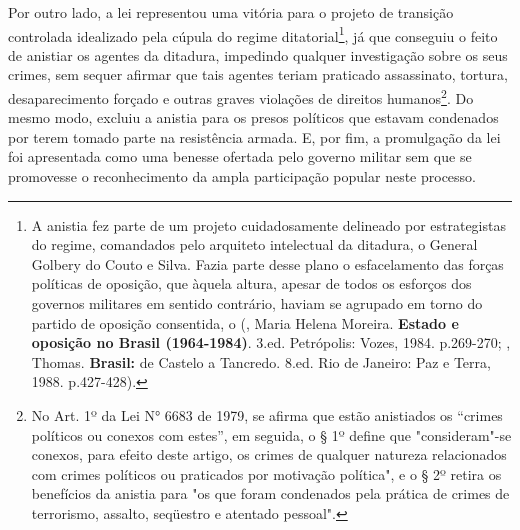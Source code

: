 Por outro lado, a lei representou uma vitória para o projeto de
transição controlada idealizado pela cúpula do regime
ditatorial\footnote{A anistia fez parte de um projeto cuidadosamente
  delineado por estrategistas do regime, comandados pelo arquiteto
  intelectual da ditadura, o General Golbery do Couto e Silva. Fazia
  parte desse plano o esfacelamento das forças políticas de oposição,
  que àquela altura, apesar de todos os esforços dos governos militares
  em sentido contrário, haviam se agrupado em torno do partido de
  oposição consentida, o  (, Maria Helena Moreira.
  \textbf{Estado e oposição no Brasil (1964-1984)}. 3.ed. Petrópolis:
  Vozes, 1984. p.269-270; , Thomas. \textbf{Brasil:} de Castelo
  a Tancredo. 8.ed. Rio de Janeiro: Paz e Terra, 1988. p.427-428).}, já
que conseguiu o feito de anistiar os agentes da ditadura, impedindo
qualquer investigação sobre os seus crimes, sem sequer afirmar que tais
agentes teriam praticado assassinato, tortura, desaparecimento forçado e
outras graves violações de direitos humanos\footnote{No Art. 1º da Lei
  N° 6683 de 1979, se afirma que estão anistiados os ``crimes políticos
  ou conexos com estes'', em seguida, o § 1º define que "consideram"-se
  conexos, para efeito deste artigo, os crimes de qualquer natureza
  relacionados com crimes políticos ou praticados por motivação
  política", e o § 2º retira os benefícios da anistia para "os que foram
  condenados pela prática de crimes de terrorismo, assalto, seqüestro e
  atentado pessoal".}. Do mesmo modo, excluiu a anistia para os presos
políticos que estavam condenados por terem tomado parte na resistência
armada. E, por fim, a promulgação da lei foi apresentada como uma
benesse ofertada pelo governo militar sem que se promovesse o
reconhecimento da ampla participação popular neste processo.

